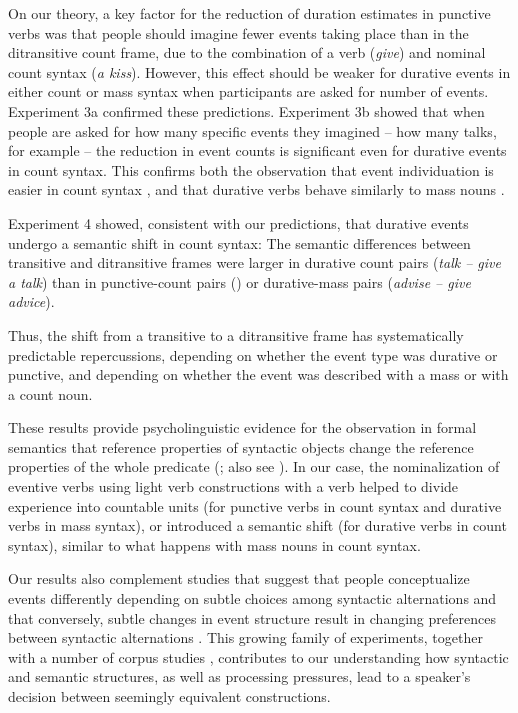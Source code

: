 \documentclass[review,12pt,authoryear]{elsarticle}
\begin{document}
On our theory, a key factor for the reduction of duration estimates in punctive verbs was that people should imagine fewer events taking place than in the ditransitive count frame, due to the combination of a  verb (\emph{give}) and nominal count syntax (\emph{a kiss}). However, this effect should be weaker for durative events in either count or mass syntax when participants are asked for number of events. Experiment 3a confirmed these predictions. Experiment 3b showed that when people are asked for how many specific events they imagined -- how many talks, for example -- the reduction in event counts is significant even for durative events in count syntax. This confirms both the observation that event individuation is easier in count syntax \citep{barner2008events}, and that durative verbs behave similarly to mass nouns \citep{Krifka1992}.

Experiment 4 showed, consistent with our predictions, that durative events undergo a semantic shift in count syntax: The semantic differences between transitive and ditransitive frames were larger in durative count pairs (\emph{talk -- give a talk}) than in punctive-count pairs () or durative-mass pairs (\emph{advise -- give advice}). 

Thus, the shift from a transitive to a ditransitive frame has systematically predictable repercussions, depending on whether the event type was durative or punctive, and depending on whether the event was described with a mass or with a count noun. 

These results provide psycholinguistic evidence for the observation in formal semantics that reference properties of syntactic objects change the reference properties of the whole predicate (\cite{Krifka1992}; also see \cite{quine1969,verkuyl1972compositional}). In our case, the nominalization of eventive verbs using light verb constructions with a  verb helped to divide experience into countable units (for punctive verbs in count syntax and durative verbs in mass syntax), or introduced a semantic shift (for durative verbs in count syntax), similar to what happens with mass nouns in count syntax.

Our results also complement studies that suggest that people conceptualize events differently depending on subtle choices among syntactic alternations \citep{fausey2010,JohnsonGoldberg2013,wittenberg2014sorting} and that conversely, subtle changes in event structure result in changing preferences between syntactic alternations \citep{gropen1991}. This growing family of experiments, together with a  number of corpus studies \citep{bresnan2007,benor2006chicken}, contributes to our understanding how syntactic and semantic structures, as well as processing pressures, lead to a speaker's decision between  seemingly equivalent constructions.
\end{document}
